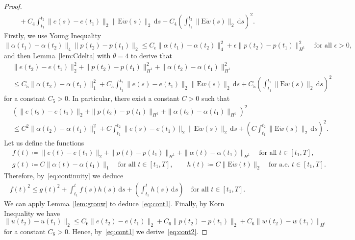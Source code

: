 \documentclass[reqno]{amsart}
\theoremstyle{definition}
\numberwithin{equation}{section}
\def\de {\mathrm{d}}
\def\EE {\mathrm{E}}
\begin{document}
\begin{proof}
\begin{align*}
&\quad+C_4\int_{t_1}^{t_2}\|e(s)-e(t_1)\|_2\|\EE \dot w(s)\|_2\,\de s+C_4\left(\int_{t_1}^{t_2}\|\EE \dot w(s)\|_2\,\de s\right)^2.
\end{align*}
Firstly, we use Young Inequality
$$\|\alpha(t_1)-\alpha(t_2)\|_4\|p(t_2)-p(t_1)\|_2\le C_\epsilon\|\alpha(t_1)-\alpha(t_2)\|_4^2+\epsilon\|p(t_2)-p(t_1)\|_{H^1}^2\quad\text{for all $\epsilon>0$},$$
and then Lemma~\ref{lem:Cdelta} with $\theta=4$ to derive that
\begin{align*}
&\|e(t_2)-e(t_1)\|_2^2+\|p(t_2)-p(t_1)\|_{H^1}^2+\|\alpha(t_2)-\alpha(t_1)\|_{H^1}^2\\
&\le C_5\|\alpha(t_2)-\alpha(t_1)\|_1^2+C_5\int_{t_1}^{t_2}\|e(s)-e(t_1)\|_2\|\EE \dot w(s)\|_2\,\de s+C_5\left(\int_{t_1}^{t_2}\|\EE \dot w(s)\|_2\,\de s\right)^2
\end{align*}
for a constant $C_5>0$. In particular, there exist a constant $C>0$ such that
\begin{align}
&\left(\|e(t_2)-e(t_1)\|_2+\|p(t_2)-p(t_1)\|_{H^1}+\|\alpha(t_2)-\alpha(t_1)\|_{H^1}\right)^2\nonumber\\
&\le C^2\|\alpha(t_2)-\alpha(t_1)\|_1^2+C\int_{t_1}^{t_2}\|e(s)-e(t_1)\|_2\|\EE \dot w(s)\|_2\,\de s+\left(C\int_{t_1}^{t_2}\|\EE \dot w(s)\|_2\,\de s\right)^2.\label{eq:continuity}
\end{align}
Let us define the functions
\begin{align*}
&f(t)\coloneqq\|e(t)-e(t_1)\|_2+\|p(t)-p(t_1)\|_{H^1}+\|\alpha(t)-\alpha(t_1)\|_{H^1}\quad\text{for all $t\in[t_1,T]$},\\
&g(t)\coloneqq C\|\alpha(t)-\alpha(t_1)\|_1\quad\text{for all $t\in[t_1,T]$},\qquad h(t)\coloneqq C\|\EE \dot w(t)\|_2\quad\text{for a.e.\ $t\in[t_1,T]$}.
\end{align*}
Therefore, by~\eqref{eq:continuity} we deduce
\begin{align*}
f(t)^2\le g(t)^2+\int_{t_1}^tf(s)h(s)\,\de s+\left(\int_{t_1}^th(s)\,\de s\right)\quad\text{for all $t\in[t_1,T]$}.
\end{align*}
We can apply Lemma~\ref{lem:gronw} to deduce~\eqref{eq:cont1}. Finally, by Korn Inequality we have
$$\|u(t_2)-u(t_1)\|_2\le C_6\|e(t_2)-e(t_1)\|_2+C_6\|p(t_2)-p(t_1)\|_2+C_6\|w(t_2)-w(t_1)\|_{H^1}$$
for a constant $C_6>0$. Hence, by~\eqref{eq:cont1} we derive~\eqref{eq:cont2}.

\end{proof}

\end{document}
